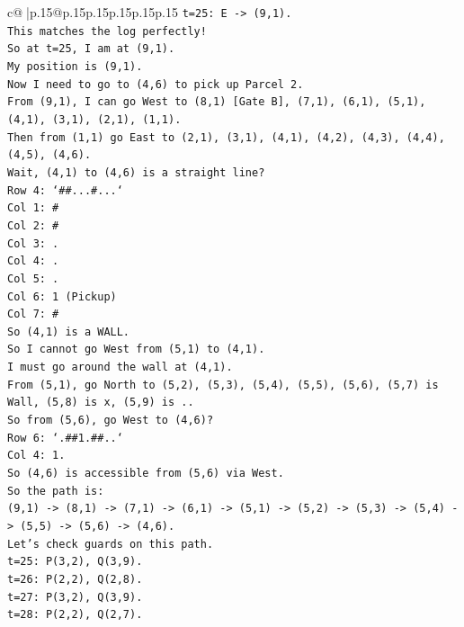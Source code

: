 \documentclass{article}
\begin{document}
{\begin{supertabular}{c@{$\;$}|p{.15\linewidth}@{}p{.15\linewidth}p{.15\linewidth}p{.15\linewidth}p{.15\linewidth}p{.15\linewidth}}
{{{\texttt{t=25: E {-}> (9,1).} \\
\texttt{This matches the log perfectly!} \\
\texttt{So at t=25, I am at (9,1).} \\
\texttt{My position is (9,1).} \\
\texttt{Now I need to go to (4,6) to pick up Parcel 2.} \\
\texttt{From (9,1), I can go West to (8,1) {[}Gate B{]}, (7,1), (6,1), (5,1), (4,1), (3,1), (2,1), (1,1).} \\
\texttt{Then from (1,1) go East to (2,1), (3,1), (4,1), (4,2), (4,3), (4,4), (4,5), (4,6).} \\
\texttt{Wait, (4,1) to (4,6) is a straight line?} \\
\texttt{Row 4: `\#\#...\#...`} \\
\texttt{Col 1: \#} \\
\texttt{Col 2: \#} \\
\texttt{Col 3: .} \\
\texttt{Col 4: .} \\
\texttt{Col 5: .} \\
\texttt{Col 6: 1 (Pickup)} \\
\texttt{Col 7: \#} \\
\texttt{So (4,1) is a WALL.} \\
\texttt{So I cannot go West from (5,1) to (4,1).} \\
\texttt{I must go around the wall at (4,1).} \\
\texttt{From (5,1), go North to (5,2), (5,3), (5,4), (5,5), (5,6), (5,7) is Wall, (5,8) is x, (5,9) is ..} \\
\texttt{So from (5,6), go West to (4,6)?} \\
\texttt{Row 6: `.\#\#1.\#\#..`} \\
\texttt{Col 4: 1.} \\
\texttt{So (4,6) is accessible from (5,6) via West.} \\
\texttt{So the path is:} \\
\texttt{(9,1) {-}> (8,1) {-}> (7,1) {-}> (6,1) {-}> (5,1) {-}> (5,2) {-}> (5,3) {-}> (5,4) {-}> (5,5) {-}> (5,6) {-}> (4,6).} \\
\texttt{Let's check guards on this path.} \\
\texttt{t=25: P(3,2), Q(3,9).} \\
\texttt{t=26: P(2,2), Q(2,8).} \\
\texttt{t=27: P(3,2), Q(3,9).} \\
\texttt{t=28: P(2,2), Q(2,7).} \\
}}}
\end{supertabular}}
\end{document}
